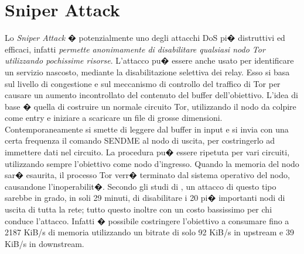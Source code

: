 \section{Sniper Attack}
Lo \emph{Sniper Attack} � potenzialmente uno degli attacchi DoS pi� distruttivi ed efficaci, infatti \emph{permette anonimamente di disabilitare qualsiasi nodo Tor utilizzando pochissime risorse}. L'attacco pu� essere anche usato per identificare un servizio nascosto, mediante la disabilitazione selettiva dei relay. Esso si basa sul livello di congestione e sul meccanismo di controllo del traffico di Tor per causare un aumento incontrollato del contenuto del buffer dell'obiettivo. L'idea di base � quella di costruire un normale circuito Tor, utilizzando il nodo da colpire come entry e iniziare a scaricare  un file di grosse dimensioni. Contemporaneamente si smette di leggere dal buffer in input e si invia con una certa frequenza il comando {\ttfamily SENDME} al nodo di uscita, per costringerlo ad immettere dati nel circuito. La procedura pu� essere ripetuta per vari circuiti, utilizzando sempre l'obiettivo come nodo d'ingresso. Quando la memoria del nodo sar� esaurita, il processo Tor verr� terminato dal sistema operativo del nodo, causandone l'inoperabilit�. Secondo gli studi di \cite{sniper}, un attacco di questo tipo sarebbe in grado, in soli 29 minuti, di disabilitare i 20 pi� importanti nodi di uscita di tutta la rete; tutto questo inoltre con un costo bassissimo per chi conduce l'attacco. Infatti � possibile costringere l'obiettivo a consumare fino a 2187 KiB/s di memoria utilizzando un bitrate di solo 92 KiB/s in upstream e 39 KiB/s in downstream.

